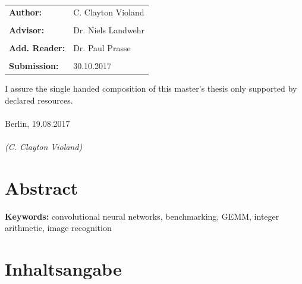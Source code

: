 \documentclass[12pt]{report}
\begin{document}
\vfill

\begin{tabular}{ll}
{\Large \bf Author:} & {\Large C. Clayton Violand} \\\\
{\Large \bf Advisor:} & {\Large Dr. Niels Landwehr} \\\\
{\Large \bf Add. Reader:} & {\Large Dr. Paul Prasse} \\\\
{\Large \bf Submission:} & {\Large 30.10.2017}
\end{tabular}

\newpage	
\thispagestyle{empty}
\hoffset=0mm
\vspace*{\fill}
\noindent I assure the single handed composition of this master's thesis only supported by declared resources.\\\\
Berlin, 19.08.2017\\\\
\noindent \textit{(C. Clayton Violand)}

\newpage
\thispagestyle{empty}
\null

\newpage
\thispagestyle{empty}
\hoffset=0mm
\section*{Abstract}	
\begin{spacing}{1.2}

\end{spacing}

\bigskip
\providecommand{\keywords}[1]{\textbf{Keywords:} #1}
\keywords{convolutional neural networks, benchmarking, GEMM, integer arithmetic, image recognition}

\section*{Inhaltsangabe}
\begin{spacing}{1.2}

\end{spacing}

\newpage
\hoffset=0mm
\setcounter{tocdepth}{3}
\setcounter{secnumdepth}{3}
\fboxsep 0mm

\newpage
\setlength{\baselineskip}{3ex}

\setcounter{page}{1}
\tableofcontents

\newpage
{}
\listoftables\begin{center}\end{center}
\end{document}
